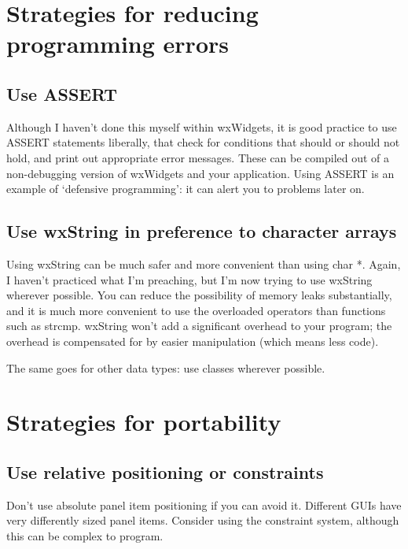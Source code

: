 \section{Strategies for reducing programming errors}\label{reducingerrors}

\subsection{Use ASSERT}\label{useassert}

Although I haven't done this myself within wxWidgets, it is good
practice to use ASSERT statements liberally, that check for conditions that
should or should not hold, and print out appropriate error messages.
These can be compiled out of a non-debugging version of wxWidgets
and your application. Using ASSERT is an example of `defensive programming':
it can alert you to problems later on.

\subsection{Use wxString in preference to character arrays}\label{usewxstring}

Using wxString can be much safer and more convenient than using char *.
Again, I haven't practiced what I'm preaching, but I'm now trying to use
wxString wherever possible. You can reduce the possibility of memory
leaks substantially, and it is much more convenient to use the overloaded
operators than functions such as strcmp. wxString won't add a significant
overhead to your program; the overhead is compensated for by easier
manipulation (which means less code).

The same goes for other data types: use classes wherever possible.

\section{Strategies for portability}\label{portability}

\subsection{Use relative positioning or constraints}\label{userelativepositioning}

Don't use absolute panel item positioning if you can avoid it. Different GUIs have
very differently sized panel items. Consider using the constraint system, although this
can be complex to program.

